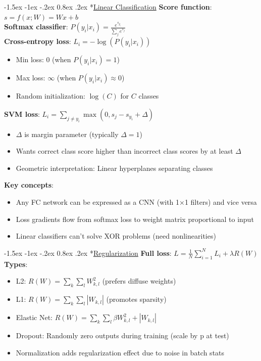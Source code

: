 \documentclass{article}
\makeatletter
\renewcommand\section{\@startsection{section}{1}{\z@}%
                                  {-1.5ex \@plus -1ex \@minus -.2ex}%
                                  {0.8ex \@plus.2ex}%
                                  {\normalfont\small\bfseries}}
\makeatother
\begin{document}
\fontsize{6pt}{7pt}\selectfont %

\begin{multicols}{3} %

\section*{\underline{Linear Classification}}
\textbf{Score function}: $s = f(x; W) = Wx + b$\\
\textbf{Softmax classifier}: $P(y_i|x_i) = \frac{e^{s_{y_i}}}{\sum_j e^{s_j}}$\\
\textbf{Cross-entropy loss}: $L_i = -\log(P(y_i|x_i))$
\begin{itemize}
\item Min loss: 0 (when $P(y_i|x_i)=1$)
\item Max loss: $\infty$ (when $P(y_i|x_i) \approx 0$)
\item Random initialization: $\log(C)$ for $C$ classes
\end{itemize}

\textbf{SVM loss}: $L_i = \sum_{j \neq y_i} \max(0, s_j - s_{y_i} + \Delta)$
\begin{itemize}
\item $\Delta$ is margin parameter (typically $\Delta = 1$)
\item Wants correct class score higher than incorrect class scores by at least $\Delta$
\item Geometric interpretation: Linear hyperplanes separating classes
\end{itemize}

\textbf{Key concepts}:
\begin{itemize}
\item Any FC network can be expressed as a CNN (with 1×1 filters) and vice versa
\item Loss gradients flow from softmax loss to weight matrix proportional to input
\item Linear classifiers can't solve XOR problems (need nonlinearities)
\end{itemize}

\section*{\underline{Regularization}}
\textbf{Full loss}: $L = \frac{1}{N} \sum_{i=1}^N L_i + \lambda R(W)$\\
\textbf{Types}:
\begin{itemize}
\item L2: $R(W) = \sum_k \sum_l W_{k,l}^2$ (prefers diffuse weights)
\item L1: $R(W) = \sum_k \sum_l |W_{k,l}|$ (promotes sparsity)
\item Elastic Net: $R(W) = \sum_k \sum_l \beta W_{k,l}^2 + |W_{k,l}|$
\item Dropout: Randomly zero outputs during training (scale by p at test)
\item Normalization adds regularization effect due to noise in batch stats
\end{itemize}


\end{multicols}
\end{document}
